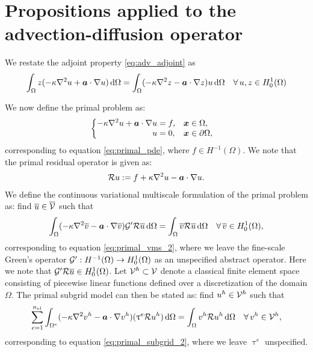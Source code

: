 \section{Propositions applied to the advection-diffusion operator}
\label{app:propositions}

We restate the adjoint property \eqref{eq:adv_adjoint} as
%
\begin{gather}
\int_{\Omega} z(-\kappa \nabla^2 {u} + \boldsymbol{a} \cdot \nabla {u}) \, \text{d} \Omega =
\int_{\Omega} (-\kappa \nabla^2 {z} - \boldsymbol{a} \cdot \nabla {z}) u \, \text{d} \Omega
\quad \forall \, u,z \in H^1_0(\Omega)
\label{eq:app_adjoint}
\end{gather}
%

We now define the primal problem as:
%
\begin{gather}
\begin{cases}
\begin{aligned}
-\kappa \nabla^2 {u} + \boldsymbol{a} \cdot \nabla {u} &= f, & & \boldsymbol{x} \in \Omega, \\
u &= 0, & & \boldsymbol{x} \in \partial \Omega,
\end{aligned}
\end{cases}
\label{eq:app_primal_pde}
\end{gather}
%
corresponding to equation \eqref{eq:primal_pde},
where $f \in H^{-1}(\Omega)$.
We note that the primal residual operator is given as:
%
\begin{gather}
\mathcal{R} u := f + \kappa \nabla^2 {u} - \boldsymbol{a} \cdot \nabla {u}.
\label{eq:app_primal_residual}
\end{gather}
We define the continuous variational multiscale formulation
of the primal problem as: find $\overline{u} \in \overline{\mathcal{V}}$ such that
%
\begin{gather}
\int_{\Omega} (-\kappa \nabla^2 {\overline{v}} - \boldsymbol{a} \cdot \nabla {\overline{v}}) \mathcal{G}' \mathcal{R} \overline{u} \, \text{d} \Omega =
\int_{\Omega} \overline{v} \mathcal{R} \overline{u} \, \text{d} \Omega
\quad \forall \, \overline{v} \in H^1_0(\Omega),
\label{eq:app_primal_vms}
\end{gather}
%
corresponding to equation \eqref{eq:primal_vms_2}, where we
leave the fine-scale Green's operator
$\mathcal{G}' : H^{-1}(\Omega) \to H^1_0(\Omega)$
as an unspecified
abstract operator.
Here we note that $\mathcal{G}' \mathcal{R} \overline{u} \in H^1_0(\Omega)$.
Let $\mathcal{V}^h \subset \mathcal{V}$ denote a classical finite element space consisting
of piecewise linear functions defined over a discretization of the
domain $\Omega$. The primal subgrid model can then be stated as: find
$u^h \in \mathcal{V}^h$ such that
%
\begin{gather}
\sum_{e=1}^{n_{el}} \int_{\Omega^e} (-\kappa \nabla^2 {v^h} - \boldsymbol{a} \cdot \nabla {v^h}) ( \uptau^e \mathcal{R} u^h)
\, \text{d} \Omega =
\int_{\Omega} v^h \mathcal{R} u^h \, \text{d} \Omega
\quad \forall \, v^h \in \mathcal{V}^h,
\label{eq:app_primal_subgrid}
\end{gather}
%
corresponding to equation \eqref{eq:primal_subgrid_2}, where we
leave $\uptau^e$ unspecified.

